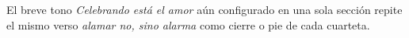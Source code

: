 El breve tono \textit{Celebrando está el amor} aún configurado en una sola sección repite el mismo verso \textit{alamar no, sino alarma} como cierre o pie de cada cuarteta. 

